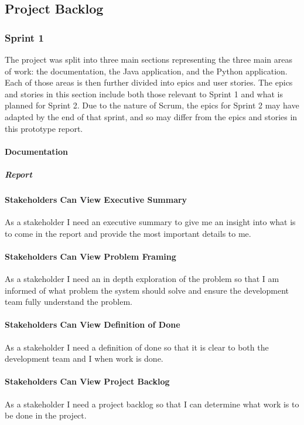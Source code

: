 \subsection{Project Backlog}

\subsubsection{Sprint 1}

The project was split into three main sections representing the three main areas of work: the documentation, the Java application, and the Python application. Each of those areas is then further divided into epics and user stories. The epics and stories in this section include both those relevant to Sprint 1 and what is planned for Sprint 2. Due to the nature of Scrum, the epics for Sprint 2 may have adapted by the end of that sprint, and so may differ from the epics and stories in this prototype report.

\paragraph{Documentation}

\subparagraph{Report}

\paragraph{Stakeholders Can View Executive Summary}
As a stakeholder I need an executive summary to give me an insight into what is to come in the report and provide the most important details to me.

\paragraph{Stakeholders Can View Problem Framing}
As a stakeholder I need an in depth exploration of the problem so that I am informed of what problem the system should solve and ensure the development team fully understand the problem.

\paragraph{Stakeholders Can View Definition of Done}
As a stakeholder I need a definition of done so that it is clear to both the development team and I when work is done.

\paragraph{Stakeholders Can View Project Backlog}
As a stakeholder I need a project backlog so that I can determine what work is to be done in the project.

